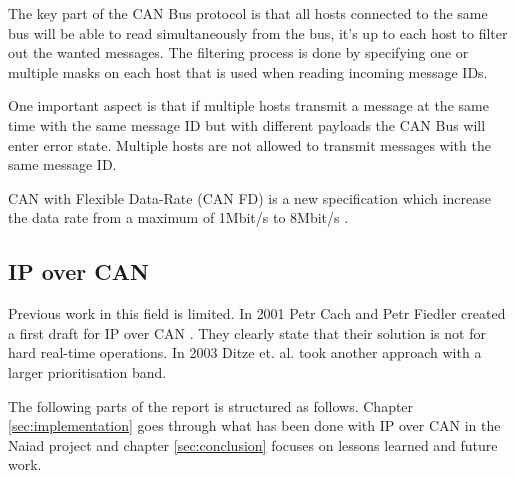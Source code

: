 The key part of the CAN Bus protocol is that all hosts connected to the same
bus will be able to read simultaneously from the bus, it's up to each host to
filter out the wanted messages. The filtering process is done by specifying one
or multiple masks on each host that is used when reading incoming message
IDs.

One important aspect is that if multiple hosts transmit a message at the same
time with the same message ID but with different payloads the CAN Bus will
enter error state. Multiple hosts are not allowed to transmit messages with the
same message ID.

CAN with Flexible Data-Rate (CAN FD) is a new specification which increase the
data rate from a maximum of 1Mbit/s to 8Mbit/s \cite{standard:can_bus_fd}.

\subsection{IP over CAN}
Previous work in this field is limited. In 2001 Petr Cach and Petr Fiedler
created a first draft for IP over CAN \cite{web:draft-ip_over_can}. They
clearly state that their solution is not for hard real-time operations. In
2003 Ditze et. al. \cite{web:porting_ip_can} took another approach with a larger prioritisation
band.

The following parts of the report is structured as follows. Chapter \ref{sec:implementation}
goes through what has been done with IP over CAN in the Naiad project and chapter
\ref{sec:conclusion} focuses on lessons learned and future work.
